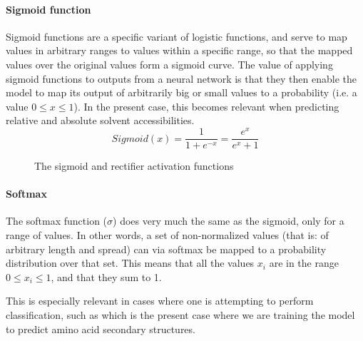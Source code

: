 \paragraph{Sigmoid function}
Sigmoid functions are a specific variant of logistic functions, and serve to map values in arbitrary ranges to values within a specific range, so that the mapped values over the original values form a sigmoid curve. The value of applying sigmoid functions to outputs from a neural network is that they then enable the model to map its output of arbitrarily big or small values to a probability (i.e. a value $0\leq x \leq 1$). In the present case, this becomes relevant when predicting relative and absolute solvent accessibilities.
\[
Sigmoid(x) = \frac{1}{1 + e^{-x}} = \frac{e^x}{e^x +1}
\]

\begin{figure}[h]
  \centering
  \caption{The sigmoid and rectifier activation functions}
\end{figure}

\paragraph{Softmax}
The softmax function ($\sigma$) does very much the same as the sigmoid, only for a range of values. In other words, a set of non-normalized values (that is: of arbitrary length and spread) can via softmax be mapped to a probability distribution over that set. This means that all the values $x_i$ are in the range $0\leq x_i \leq 1$, and that they sum to 1.

This is especially relevant in cases where one is attempting to perform classification, such as which is the present case where we are training the model to predict amino acid secondary structures. 

